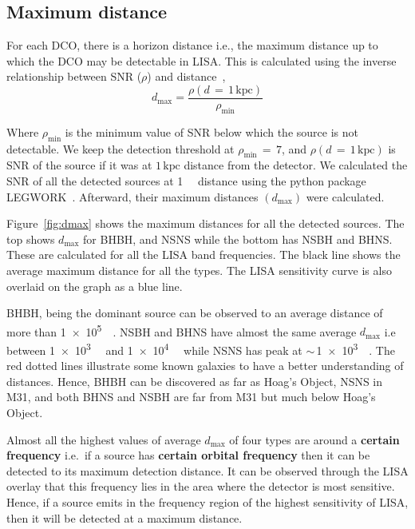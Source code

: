 \documentclass[journal, twocolumn]{IEEEtran}
\newcommand{\kpc}{\kilo\parsec}
\begin{document}
    \subsection{Maximum distance}\label{subsec:maximum-distance}
    For each DCO, there is a horizon distance i.e., the maximum distance up to which the DCO may be detectable in
    LISA. This is calculated using the inverse relationship between SNR ($\rho$) and distance~\cite{Lau2020},
    \begin{equation}
        \label{eq:eq1}
        d_\text{max}=\frac{\rho(d\,=\,1\,\text{kpc})}{\rho_\text{min}}
    \end{equation}

    Where $\rho_{\min}$ is the minimum value of SNR below which the source is not detectable.
    We keep the detection threshold at $\rho_{\min}\,=\,7$, and $\rho(d\,=\,1\,\text{kpc})$ is SNR of the source if it was at $1\,\text{kpc}$ distance from the detector.
    We calculated the SNR of all the detected sources at \SI{1}{\kpc} distance using the python package LEGWORK~\cite{wagg2021legwork}.
    Afterward, their maximum distances $(d_{\max})$ were calculated.

    Figure~\ref{fig:dmax} shows the maximum distances for all the detected sources.
    The top shows $d_{\max}$ for BHBH, and NSNS while the bottom has NSBH and BHNS\@.
    These are calculated for all the LISA band frequencies.
    The black line shows the average maximum distance for all the types.
    The LISA sensitivity curve is also overlaid on the graph as a blue line.

    BHBH, being the dominant source can be observed to an average distance of more than \SI{1e5}{\kpc}.
    NSBH and BHNS have almost the same average $d_{\max}$ i.e between \SI{1e3}{\kpc} and \SI{1e4}{\kpc} while NSNS has peak at $\sim\,$\SI{1e3}{\kpc}.
    The red dotted lines illustrate some known galaxies to have a better understanding of distances.
    Hence, BHBH can be discovered as far as Hoag's Object, NSNS in M31, and both BHNS and NSBH are far from M31 but much below Hoag's Object.


    Almost all the highest values of average $d_{\max}$ of four types are around a \textbf{certain frequency} i.e.\ if a source has \textbf{certain orbital frequency} then it can be detected to its maximum detection distance.
    It can be observed through the LISA overlay that this frequency lies in the area where the detector is most sensitive.
    Hence, if a source emits in the frequency region of the highest sensitivity of LISA, then it will be detected at a maximum distance.
\end{document}
